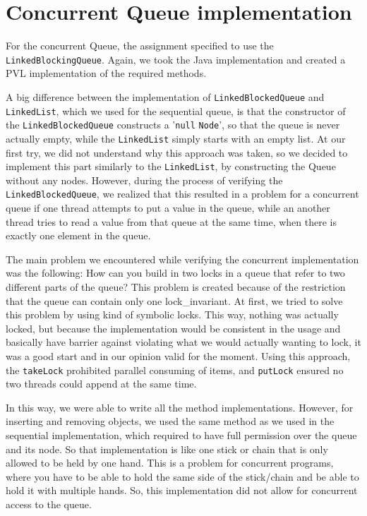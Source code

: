 \section{Concurrent Queue implementation}
For the concurrent Queue, the assignment specified to use the {\tt LinkedBlockingQueue}. Again, we took the Java implementation and created a PVL implementation of the required methods.

A big difference between the implementation of {\tt LinkedBlockedQueue} and {\tt LinkedList}, which we used for the sequential queue, is that the constructor of the {\tt LinkedBlockedQueue} constructs a '{\tt null} {\tt Node}', so that the queue is never actually empty, while the {\tt LinkedList} simply starts with an empty list. At our first try, we did not understand why this approach was taken, so we decided to implement this part similarly to the {\tt LinkedList}, by constructing the Queue without any nodes. However, during the process of verifying the {\tt LinkedBlockedQueue}, we realized that this resulted in a problem for a concurrent queue if one thread attempts to put a value in the queue, while an another thread tries to read a value from that queue at the same time, when there is exactly one element in the queue.

The main problem we encountered while verifying the concurrent implementation was the following:
How can you build in two locks in a queue that refer to two different parts of the queue? This problem is created because of the restriction that the queue can contain only one lock\_invariant. At first, we tried to solve this problem by using kind of symbolic locks. This way, nothing was actually locked, but because the implementation would be consistent in the usage and basically have barrier against violating what we would actually wanting to lock, it was a good start and in our opinion valid for the moment. Using this approach, the {\tt takeLock} prohibited parallel consuming of items, and {\tt putLock} ensured no two threads could append at the same time.

In this way, we were able to write all the method implementations. However, for inserting and removing objects, we used the same method as we used in the sequential implementation, which required to have full permission over the queue and its node. So that implementation is like one stick or chain that is only allowed to be held by one hand. This is a problem for concurrent programs, where you have to be able to hold the same side of the stick/chain and be able to hold it with multiple hands. So, this implementation did not allow for concurrent access to the queue.

